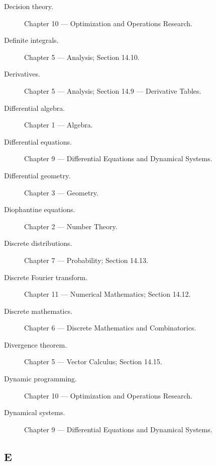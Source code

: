 \begin{description}

\item[Decision theory.]
Chapter 10 --- Optimization and Operations Research.

\item[Definite integrals.]
Chapter 5 --- Analysis;
Section 14.10.

\item[Derivatives.]
Chapter 5 --- Analysis;
Section 14.9 --- Derivative Tables.

\item[Differential algebra.]
Chapter 1 --- Algebra.

\item[Differential equations.]
Chapter 9 --- Differential Equations and Dynamical Systems.

\item[Differential geometry.]
Chapter 3 --- Geometry.

\item[Diophantine equations.]
Chapter 2 --- Number Theory.

\item[Discrete distributions.]
Chapter 7 --- Probability;
Section 14.13.

\item[Discrete Fourier transform.]
Chapter 11 --- Numerical Mathematics;
Section 14.12.

\item[Discrete mathematics.]
Chapter 6 --- Discrete Mathematics and Combinatorics.

\item[Divergence theorem.]
Chapter 5 --- Vector Calculus;
Section 14.15.

\item[Dynamic programming.]
Chapter 10 --- Optimization and Operations Research.

\item[Dynamical systems.]
Chapter 9 --- Differential Equations and Dynamical Systems.

\end{description}

\subsection*{E}

